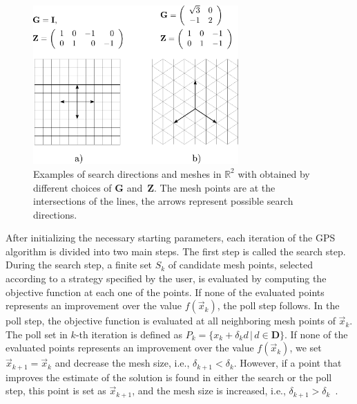 \begin{figure}[H]
	\centering
	\includegraphics[width=0.70\textwidth]{figures/gps.pdf}
	\caption{Examples of search directions and meshes in $\mathbb{R}^2$ with
		obtained by different choices of $\mathbf{G}$ and~$\mathbf{Z}$. The mesh points
		are at the intersections of the lines, the arrows represent possible search directions.}
	\label{fig:gps}
\end{figure}


After initializing the necessary starting parameters, each iteration of the GPS algorithm is divided into two main steps. The first step is called the search step. During the search step, a finite set $S_k$ of candidate mesh points, selected according to a strategy specified by the user, is evaluated by computing the objective function at each one of the points. If none of the evaluated points represents an improvement over the value $ f(\vec{x}_k) $, the poll step follows. In the poll step, the objective function is evaluated at all neighboring mesh points of $ \vec{x}_k $. The poll set in $k$-th iteration is defined as $P_k = \{x_k + \delta_k d \, | \, d \in \mathbf{D}\}$. If none of the evaluated points represents an improvement over the value $ f(\vec{x}_k) $, we set $ \vec{x}_{k+1} = \vec{x}_k $ and decrease the mesh size, i.e., $ \delta_{k+1} < \delta_k $. However, if a point that improves the estimate of the solution is found in either the search or the poll step, this point is set as $ \vec{x}_{k+1} $, and the mesh size is increased, i.e., $ \delta_{k+1} > \delta_k $~\cite{BBO-textbook, Audet2002}.

